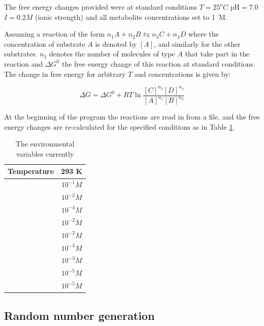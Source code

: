 \documentclass[10pt,a4paper]{article}
\begin{document}
	The free energy changes provided were at standard conditions $T=25  ^o C$ pH$=7.0$ $I=0.2 M$ (ionic strength) and all metabolite concentrations set to 1~M.
	
	Assuming a reaction of the form $n_1A + n_2B \leftrightarrows n_3C + n_4D$ where the concentration of substrate $A$ is denoted by $[A]$, and similarly for the other substrates. $n_1$ denotes the number of molecules of type $A$ that take part in the reaction and  $\Delta G^0$  the free energy change of this reaction at standard conditions. The change in free energy for arbitrary $T$ and concentrations is given by: 
	
	\begin{equation}\label{eq:freeechange}
		\Delta G = \Delta G^0 + R T \ln \frac{[C]^{n_3}[D]^{n_4}}{[A]^{n_1}[B]^{n_2}}
	\end{equation}
	
	At the beginning of the program the reactions are read in from a file, and the free energy changes are re-calculated for the specified conditions as in Table \ref{environmentTable}. 
	
	\begin{table}
		\centering
	\begin{tabular}{|c|c|}
		
		\hline Temperature & 293 K \\ 
		\hline [ATP] & $10^{-1} M$ \\ 
		\hline [ADP] & $10^{-2} M$ \\ 
		\hline [AMP] & $10^{-4} M$ \\ 
		\hline [NAD] & $10^{-2} M$ \\ 
		\hline [NADH] & $10^{-2} M$ \\ 
		\hline [Pi] &  $10^{-3} M$\\ 
		\hline [PPi] & $10^{-3} M$ \\ 
		\hline [CO$_2$] & $10^{-5} M$ \\ 
		\hline [NH$_3$] & $10^{-5} M$ \\ 

		\hline 
	\end{tabular} 
	\caption{The environmental variables currently}
	\label{environmentTable}
	\end{table}

\subsection{Random number generation}
\label{sub:Random number generation}
\end{document}

